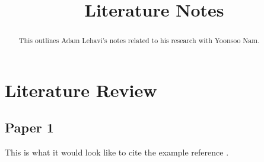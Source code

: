 \documentclass[conference]{IEEEtran}
\begin{document}
\title{Literature Notes}

\author{
}

\maketitle

\begin{abstract}
This outlines Adam Lehavi's notes related to his research with Yoonsoo Nam.
\end{abstract}

\section{Literature Review}
\subsection{Paper 1}
This is what it would look like to cite the example reference \cite{alon2016probabilistic}.



\end{document}
